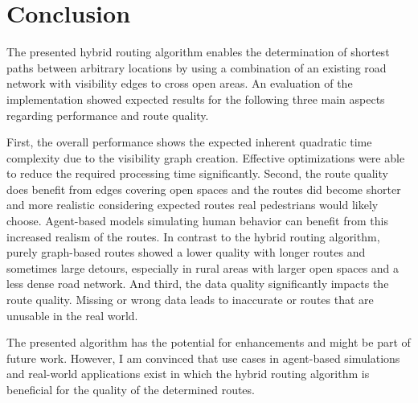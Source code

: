 \section{Conclusion}

	The presented hybrid routing algorithm enables the determination of shortest paths between arbitrary locations by using a combination of an existing road network with visibility edges to cross open areas.
	An evaluation of the implementation showed expected results for the following three main aspects regarding performance and route quality.
	
	First, the overall performance shows the expected inherent quadratic time complexity due to the visibility graph creation.
	Effective optimizations were able to reduce the required processing time significantly.
	Second, the route quality does benefit from edges covering open spaces and the routes did become shorter and more realistic considering expected routes real pedestrians would likely choose.
	Agent-based models simulating human behavior can benefit from this increased realism of the routes.
	In contrast to the hybrid routing algorithm, purely graph-based routes showed a lower quality with longer routes and sometimes large detours, especially in rural areas with larger open spaces and a less dense road network.
	And third, the data quality significantly impacts the route quality.
	Missing or wrong data leads to inaccurate or routes that are unusable in the real world.
	
	The presented algorithm has the potential for enhancements and might be part of future work.
	However, I am convinced that use cases in agent-based simulations and real-world applications exist in which the hybrid routing algorithm is beneficial for the quality of the determined routes.